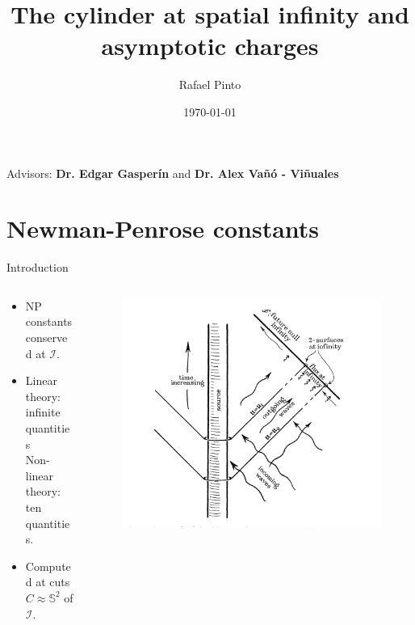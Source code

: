 \documentclass{beamer}
\title[Spin-0 fields NP constants]{The cylinder at spatial infinity and asymptotic charges}
\author[Rafael Pinto]{Rafael Pinto}
\institute[CENTRA-GRIT]{Instituto Superior Técnico}
\date{\today}
\theoremstyle{remark}
\theoremstyle{plain}
\theoremstyle{plain}
\begin{document}
\begin{frame}
  \titlepage
  \vfill
  \begin{center}
    Advisors: \textbf{Dr. Edgar Gasper\'in} and \textbf{Dr. Alex Va\~{n}\'o - Vi\~{n}uales}
  \end{center}
\end{frame}

\section{Newman-Penrose constants}
\begin{frame}{Introduction}
  \begin{columns}
    \begin{column}{0.5\textwidth}
      \begin{itemize}
      \item NP constants conserved at $\mathscr{I}$.
      \vspace{7mm}
      \item Linear theory: infinite quantities \\
      Non-linear theory: ten quantities.
      \vspace{5mm}
      \item Computed at cuts ${C} \approx \mathbb{S}^2$ of $\mathscr{I}$.
    \end{itemize}
  \end{column}
  \begin{column}{0.5\textwidth}
    \vspace*{-.8em} %
    \hfill
    \begin{figure}[h]
      \includegraphics[width=1.2\textwidth]{penrose constants.png} 
    \end{figure}
  \end{column}
\end{columns}
\end{frame}
\end{document}
